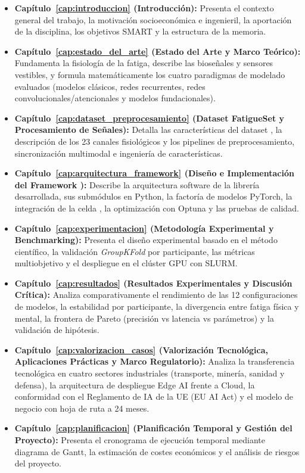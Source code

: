 \begin{itemize}
    \item \textbf{Capítulo~\ref{cap:introduccion} (Introducción):} Presenta el contexto general del trabajo, la motivación socioeconómica e ingenieril, la aportación de la disciplina, los objetivos SMART y la estructura de la memoria.
    \item \textbf{Capítulo~\ref{cap:estado_del_arte} (Estado del Arte y Marco Teórico):} Fundamenta la fisiología de la fatiga, describe las bioseñales y sensores vestibles, y formula matemáticamente los cuatro paradigmas de modelado evaluados (modelos clásicos, redes recurrentes, redes convolucionales/atencionales y modelos fundacionales).
    \item \textbf{Capítulo~\ref{cap:dataset_preprocesamiento} (Dataset FatigueSet y Procesamiento de Señales):} Detalla las características del dataset \fatigueset{}, la descripción de los 23 canales fisiológicos y los pipelines de preprocesamiento, sincronización multimodal e ingeniería de características.
    \item \textbf{Capítulo~\ref{cap:arquitectura_framework} (Diseño e Implementación del Framework ):} Describe la arquitectura software de la librería desarrollada, sus submódulos en Python, la factoría de modelos PyTorch, la integración de la celda \slstm{}, la optimización con Optuna y las pruebas de calidad.
    \item \textbf{Capítulo~\ref{cap:experimentacion} (Metodología Experimental y Benchmarking):} Presenta el diseño experimental basado en el método científico, la validación \textit{GroupKFold} por participante, las métricas multiobjetivo y el despliegue en el clúster GPU con SLURM.
    \item \textbf{Capítulo~\ref{cap:resultados} (Resultados Experimentales y Discusión Crítica):} Analiza comparativamente el rendimiento de las 12 configuraciones de modelos, la estabilidad por participante, la divergencia entre fatiga física y mental, la frontera de Pareto (precisión vs latencia vs parámetros) y la validación de hipótesis.
    \item \textbf{Capítulo~\ref{cap:valorizacion_casos} (Valorización Tecnológica, Aplicaciones Prácticas y Marco Regulatorio):} Analiza la transferencia tecnológica en cuatro sectores industriales (transporte, minería, sanidad y defensa), la arquitectura de despliegue Edge AI frente a Cloud, la conformidad con el Reglamento de IA de la UE (EU AI Act) y el modelo de negocio con hoja de ruta a 24 meses.
    \item \textbf{Capítulo~\ref{cap:planificacion} (Planificación Temporal y Gestión del Proyecto):} Presenta el cronograma de ejecución temporal mediante diagrama de Gantt, la estimación de costes económicos y el análisis de riesgos del proyecto.

\end{itemize}

